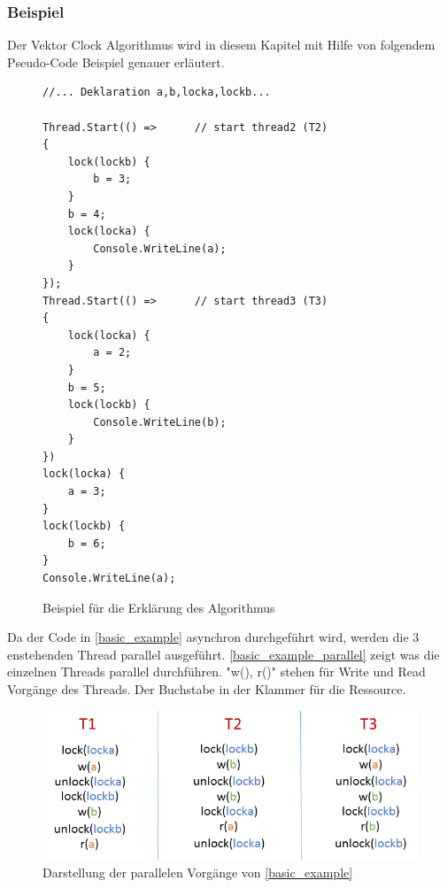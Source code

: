 \documentclass[10pt,a4paper]{article}
\begin{document}
\subsubsection{Beispiel}\label{example}
Der Vektor Clock Algorithmus wird in diesem Kapitel mit Hilfe von folgendem Pseudo-Code Beispiel genauer erläutert.\\
\begin{figure}[H]
\begin{singlespace}
\begin{lstlisting}[basicstyle=\small]
//... Deklaration a,b,locka,lockb...

Thread.Start(() =>		// start thread2 (T2)
{
	lock(lockb) {
		b = 3;
	}
	b = 4;
	lock(locka) {
		Console.WriteLine(a);
	}
});
Thread.Start(() =>		// start thread3 (T3)
{
	lock(locka) {
		a = 2;
	}
	b = 5;
	lock(lockb) {
		Console.WriteLine(b);
	}
})
lock(locka) {
	a = 3;
}
lock(lockb) {
	b = 6;
}
Console.WriteLine(a);
\end{lstlisting}
\end{singlespace}
\caption{Beispiel für die Erklärung des Algorithmus}\label{basic_example}
\end{figure}
Da der Code in \autoref{basic_example} asynchron durchgeführt wird, werden die 3 enstehenden Thread parallel ausgeführt. \autoref{basic_example_parallel} zeigt was die einzelnen Threads parallel durchführen. "w(), r()" stehen für Write und Read Vorgänge des Threads. Der Buchstabe in der Klammer für die Ressource.
\begin{figure}[H]
\centering
\includegraphics[scale=0.5]{images/VectorCheckingAlgorithm.png}
\caption{Darstellung der parallelen Vorgänge von \autoref{basic_example}}
\label{basic_example_parallel}
\end{figure}
\newpage
\end{document}
